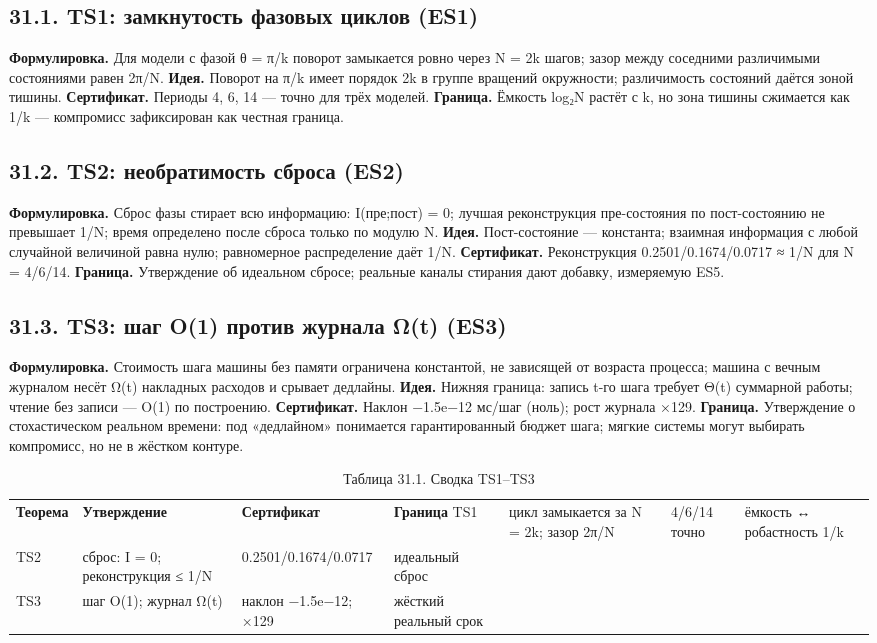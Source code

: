 \documentclass[11pt,a4paper]{article}
\begin{document}
\subsection{31.1. TS1: замкнутость фазовых циклов (ES1)}

\textbf{Формулировка.} Для модели с фазой θ = π/k поворот замыкается ровно через N = 2k шагов; зазор между соседними различимыми состояниями равен 2π/N. \textbf{Идея.} Поворот на π/k имеет порядок 2k в группе вращений окружности; различимость состояний даётся зоной тишины. \textbf{Сертификат.} Периоды 4, 6, 14 — точно для трёх моделей. \textbf{Граница.} Ёмкость log₂N растёт с k, но зона тишины сжимается как 1/k — компромисс зафиксирован как честная граница.

\subsection{31.2. TS2: необратимость сброса (ES2)}

\textbf{Формулировка.} Сброс фазы стирает всю информацию: I(пре;пост) = 0; лучшая реконструкция пре-состояния по пост-состоянию не превышает 1/N; время определено после сброса только по модулю N. \textbf{Идея.} Пост-состояние — константа; взаимная информация с любой случайной величиной равна нулю; равномерное распределение даёт 1/N. \textbf{Сертификат.} Реконструкция 0.2501/0.1674/0.0717 ≈ 1/N для N = 4/6/14. \textbf{Граница.} Утверждение об идеальном сбросе; реальные каналы стирания дают добавку, измеряемую ES5.

\subsection{31.3. TS3: шаг O(1) против журнала Ω(t) (ES3)}

\textbf{Формулировка.} Стоимость шага машины без памяти ограничена константой, не зависящей от возраста процесса; машина с вечным журналом несёт Ω(t) накладных расходов и срывает дедлайны. \textbf{Идея.} Нижняя граница: запись t-го шага требует Θ(t) суммарной работы; чтение без записи — O(1) по построению. \textbf{Сертификат.} Наклон −1.5e−12 мс/шаг (ноль); рост журнала ×129. \textbf{Граница.} Утверждение о стохастическом реальном времени: под «дедлайном» понимается гарантированный бюджет шага; мягкие системы могут выбирать компромисс, но не в жёстком контуре.

\begin{table}[htbp]\centering\small
\caption{Таблица 31.1. Сводка TS1–TS3}
\begin{tabular}{p{} p{} p{} p{}}
\toprule
\textbf{Теорема} & \textbf{Утверждение} & \textbf{Сертификат} & \textbf{Граница}
\midrule
TS1 & цикл замыкается за N = 2k; зазор 2π/N & 4/6/14 точно & ёмкость ↔ робастность 1/k \\
TS2 & сброс: I = 0; реконструкция ≤ 1/N & 0.2501/0.1674/0.0717 & идеальный сброс \\
TS3 & шаг O(1); журнал Ω(t) & наклон −1.5e−12; ×129 & жёсткий реальный срок \\
\bottomrule
\end{tabular}
\end{table}
\end{document}
